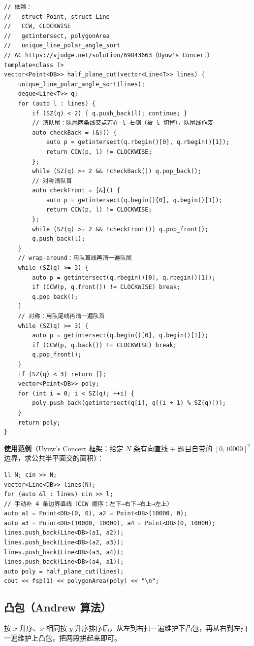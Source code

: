 		\begin{verbatim}
// 依赖：
//   struct Point, struct Line
//   CCW, CLOCKWISE
//   getintersect, polygonArea
//   unique_line_polar_angle_sort
// AC https://vjudge.net/solution/69843663（Uyuw's Concert）
template<class T>
vector<Point<DB>> half_plane_cut(vector<Line<T>> lines) {
	unique_line_polar_angle_sort(lines);
	deque<Line<T>> q;
	for (auto l : lines) {
		if (SZ(q) < 2) { q.push_back(l); continue; }
		// 清队尾：队尾两条线交点若在 l 右侧（被 l 切掉），队尾线作废
		auto checkBack = [&]() {
			auto p = getintersect(q.rbegin()[0], q.rbegin()[1]);
			return CCW(p, l) != CLOCKWISE;
		};
		while (SZ(q) >= 2 && !checkBack()) q.pop_back();
		// 对称清队首
		auto checkFront = [&]() {
			auto p = getintersect(q.begin()[0], q.begin()[1]);
			return CCW(p, l) != CLOCKWISE;
		};
		while (SZ(q) >= 2 && !checkFront()) q.pop_front();
		q.push_back(l);
	}
	// wrap-around：用队首线再清一遍队尾
	while (SZ(q) >= 3) {
		auto p = getintersect(q.rbegin()[0], q.rbegin()[1]);
		if (CCW(p, q.front()) != CLOCKWISE) break;
		q.pop_back();
	}
	// 对称：用队尾线再清一遍队首
	while (SZ(q) >= 3) {
		auto p = getintersect(q.begin()[0], q.begin()[1]);
		if (CCW(p, q.back()) != CLOCKWISE) break;
		q.pop_front();
	}
	if (SZ(q) < 3) return {};
	vector<Point<DB>> poly;
	for (int i = 0; i < SZ(q); ++i) {
		poly.push_back(getintersect(q[i], q[(i + 1) % SZ(q)]));
	}
	return poly;
}
		\end{verbatim}

		\textbf{使用范例}（Uyuw's Concert 框架：给定 $N$ 条有向直线 + 题目自带的 $[0, 10000]^2$ 边界，求公共半平面交的面积）：

		\begin{verbatim}
ll N; cin >> N;
vector<Line<DB>> lines(N);
for (auto &l : lines) cin >> l;
// 手动补 4 条边界直线（CCW 顺序：左下→右下→右上→左上）
auto a1 = Point<DB>(0, 0), a2 = Point<DB>(10000, 0);
auto a3 = Point<DB>(10000, 10000), a4 = Point<DB>(0, 10000);
lines.push_back(Line<DB>(a1, a2));
lines.push_back(Line<DB>(a2, a3));
lines.push_back(Line<DB>(a3, a4));
lines.push_back(Line<DB>(a4, a1));
auto poly = half_plane_cut(lines);
cout << fsp(1) << polygonArea(poly) << "\n";
		\end{verbatim}

		\subsection{凸包（Andrew 算法）}

		按 $x$ 升序、$x$ 相同按 $y$ 升序排序后，从左到右扫一遍维护下凸包，再从右到左扫一遍维护上凸包，把两段拼起来即可。

